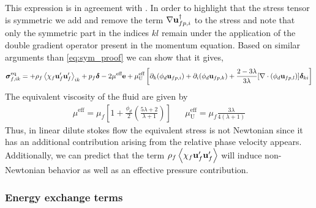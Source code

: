 This expression is in agreement with \citet[Appendix A]{zhang1997momentum}. 
In order to highlight that the stress tensor is symmetric we add and remove the term $ \mathbf{\nabla} \textbf{u}_{fp,i}^\dagger$  to the stress and note that only the symmetric part in the indices $kl$ remain under the application of the double gradient operator present in the momentum equation. 
Based on similar arguments than \ref{eq:sym_proof} we can show that it gives, 
\begin{align}
    \bm{\sigma}^\text{eq}_{f,ik} =
    + \rho_f\avg{\chi_f\textbf{u}_f'\textbf{u}_f'}_{ik} 
    + p_f \bm\delta
    - 2\mu^\text{eff} \textbf{e}
    + 
    \mu_\text{U}^\text{eff}
    \left[
        \partial_k   (\phi_d\textbf{u}_{fp,i})
        + \partial_i (\phi_d\textbf{u}_{fp,k})
        + \frac{2-3\lambda}{3\lambda}  [\div (\phi_d\textbf{u}_{fp,l})]\bm\delta_{ki}
    \right]
    \label{eq:fluid_phase_stress}
\end{align} 
The equivalent viscosity of the fluid are given by 
\begin{align*}
    \mu^\text{eff} = \mu_f \left[
        1
        +\frac{\phi_d}{2}\left(
            \frac{5\lambda +2}{\lambda +1}
        \right)
    \right] &&
    \mu^\text{eff}_\text{U}
    = \mu_f\frac{ 3\lambda}{4(\lambda +1) }
\end{align*}
Thus, in linear dilute stokes flow the equivalent stress is not Newtonian since it has an additional contribution arising from the relative phase velocity appears. 
Additionally, we can predict that the term $\rho_f\left<\chi_f\textbf{u}_f'\textbf{u}_f'\right>$ will induce non-Newtonian behavior as well as an effective pressure contribution. 

\subsubsection{Energy exchange terms}


